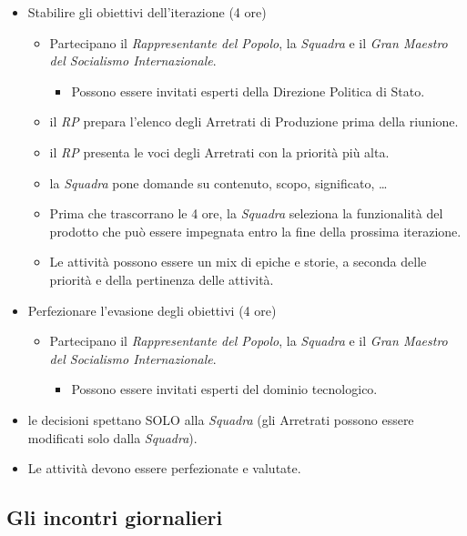\begin{itemize}
  \item Stabilire gli obiettivi dell'iterazione (4 ore)
  \begin{itemize}
    \item Partecipano il \textit{Rappresentante del Popolo}, la \textit{Squadra} e il \textit{Gran Maestro del Socialismo Internazionale}.
    \begin{itemize}
      \item Possono essere invitati esperti della Direzione Politica di Stato.
    \end{itemize}
    \item il \textit{RP} prepara l'elenco degli Arretrati di Produzione prima della riunione.
    \item il \textit{RP} presenta le voci degli Arretrati con la priorit\`a pi\`u alta.
    \item la \textit{Squadra} pone domande su contenuto, scopo, significato, …
    \item Prima che trascorrano le 4 ore, la \textit{Squadra} seleziona la funzionalit\`a del prodotto che pu\`o essere impegnata entro la fine della prossima iterazione.
    \item Le attivit\`a possono essere un mix di epiche e storie, a seconda delle priorit\`a e della pertinenza delle attivit\`a.
  \end{itemize}
  \item Perfezionare l'evasione degli obiettivi (4 ore)
  \begin{itemize}
    \item Partecipano il \textit{Rappresentante del Popolo}, la \textit{Squadra} e il \textit{Gran Maestro del Socialismo Internazionale}.
    \begin{itemize}
      \item Possono essere invitati esperti del dominio tecnologico.
    \end{itemize}
  \end{itemize}
  \item le decisioni spettano SOLO alla \textit{Squadra} (gli Arretrati possono essere modificati solo dalla \textit{Squadra}).
  \item Le attivit\`a devono essere perfezionate e valutate.
\end{itemize}

\subsection{Gli incontri giornalieri}

